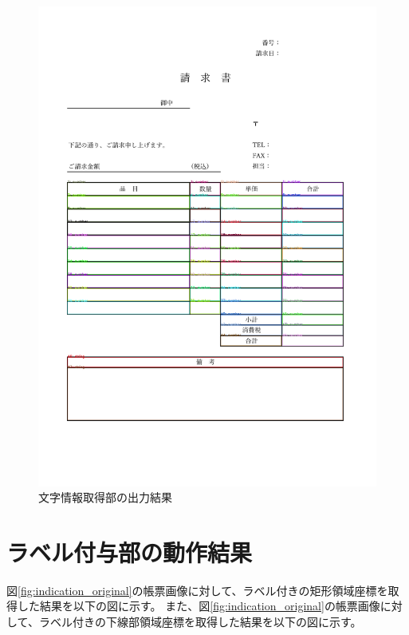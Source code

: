 \begin{figure}[t]
    \begin{center}
        \includegraphics[width=15cm]{image/05-indication/rects_with_label.png}
        \caption{文字情報取得部の出力結果}
        \label{fig:}
    \end{center}
\end{figure}

\section{ラベル付与部の動作結果}\label{sec:result_area_labeling}
図\ref{fig:indication_original}の帳票画像に対して、ラベル付きの矩形領域座標を取得した結果を以下の図に示す。
また、図\ref{fig:indication_original}の帳票画像に対して、ラベル付きの下線部領域座標を取得した結果を以下の図に示す。

